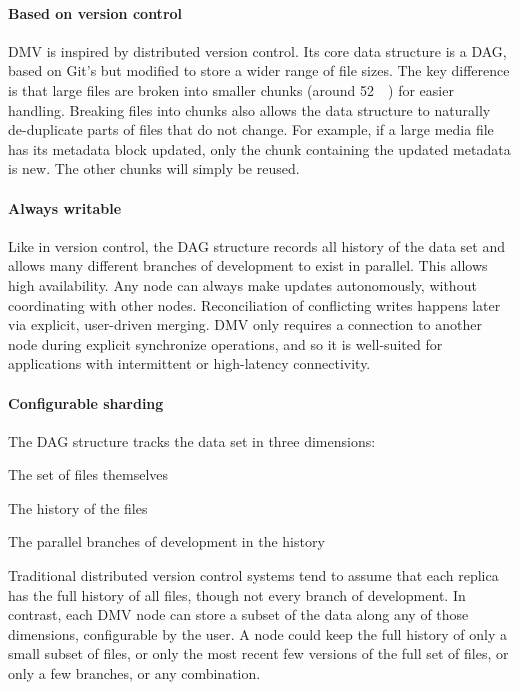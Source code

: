 

\paragraph{Based on version control}

DMV is inspired by distributed version control. Its core data structure is a
DAG, based on Git's but modified to store a wider range of file sizes. The key
difference is that large files are broken into smaller chunks (around
\SI{52}{\kibi\byte}) for easier handling. Breaking files into chunks also allows
the data structure to naturally de-duplicate parts of files that do not change.
For example, if a large media file has its metadata block updated, only the
chunk containing the updated metadata is new. The other chunks will simply be
reused.


\paragraph{Always writable}

Like in version control, the DAG structure records all history of the data set
and allows many different branches of development to exist in parallel. This
allows high availability. Any node can always make updates autonomously, without
coordinating with other nodes. Reconciliation of conflicting writes happens
later via explicit, user-driven merging. DMV only requires a connection to another node during
explicit synchronize operations, and so it is well-suited for applications with
intermittent or high-latency connectivity.


\paragraph{Configurable sharding}

The DAG structure tracks the data set in three dimensions:

\begin{tight_enumerate}
    \item The set of files themselves
    \item The history of the files
    \item The parallel branches of development in the history
\end{tight_enumerate}

Traditional distributed version control systems tend to assume that each replica
has the full history of all files, though not every branch of development. In
contrast, each DMV node can store a subset of the data along any of those
dimensions, configurable by the user. A node could keep the full history of only
a small subset of files, or only the most recent few versions of the full set of
files, or only a few branches, or any combination.


